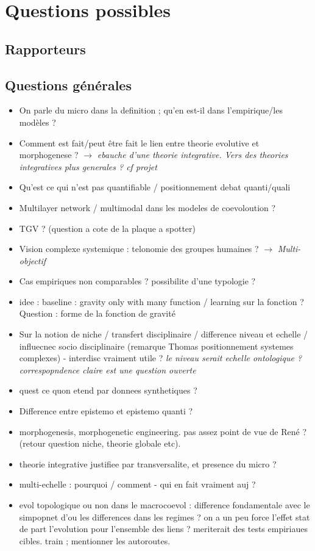 \documentclass[11pt]{article}
\begin{document}
\section*{Questions possibles}


\subsection*{Rapporteurs}




\subsection*{Questions générales}


\begin{itemize}
	\item On parle du micro dans la definition ; qu'en est-il dans l'empirique/les modèles ?
	\item Comment est fait/peut être fait le lien entre theorie evolutive et morphogenese ? $\rightarrow$ \textit{ebauche d'une theorie integrative. Vers des theories integratives plus generales ? cf projet}
	\item Qu'est ce qui n'est pas quantifiable / positionnement debat quanti/quali
	\item Multilayer network / multimodal dans les modeles de coevoloution ?
	\item TGV ? (question a cote de la plaque a spotter)
	\item Vision complexe systemique : telonomie des groupes humaines ? $\rightarrow$ \textit{Multi-objectif}
	\item Cas empiriques non comparables ? possibilite d'une typologie ?
	\item idee : baseline : gravity only with many function / learning sur la fonction ? Question : forme de la fonction de gravité
	\item Sur la notion de niche / transfert disciplinaire / difference niveau et echelle / influecnec socio disciplinaire (remarque Thomas positionnement systemes complexes) - interdisc vraiment utile ? \textit{le niveau serait echelle ontologique ? correspopndence claire est une question ouverte}
	\item quest ce quon etend par donnees synthetiques ?
	\item Difference entre epistemo et epistemo quanti ?
	\item morphogenesis, morphogenetic engineering. pas assez point de vue de René ? (retour question niche, theorie globale etc).
	\item theorie integrative justifiee par transversalite, et presence du micro ?
	\item multi-echelle : pourquoi / comment - qui en fait vraiment auj ?
	\item evol topologique ou non dans le macrocoevol : difference fondamentale avec le simpopnet d'ou les differences dans les regimes ? on a un peu force l'effet stat de part l'evolution pour l'ensemble des liens ? meriterait des tests empiriaues cibles. train ; mentionner les autoroutes.
	
\end{itemize}
\end{document}
